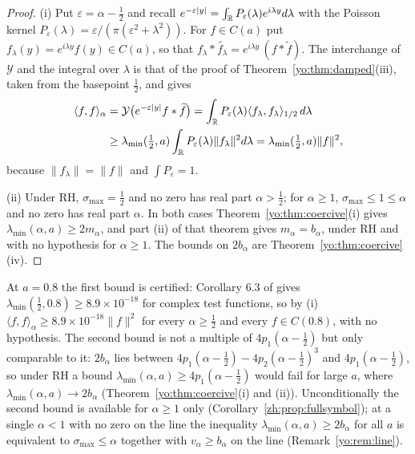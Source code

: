 \begin{proof}
(i) Put $\varepsilon=\alpha-\frac12$ and recall $e^{-\varepsilon|y|}=\int_{\mathbb{R}}P_\varepsilon(\lambda)e^{i\lambda y}d\lambda$ with the Poisson kernel $P_\varepsilon(\lambda)=\varepsilon/(\pi(\varepsilon^2+\lambda^2))$. For $f\in C(a)$ put $f_\lambda(y)=e^{i\lambda y}f(y)\in C(a)$, so that $f_\lambda*\widetilde{f_\lambda}=e^{i\lambda y}\,(f*\widetilde f)$. The interchange of $\mathcal Y$ and the integral over $\lambda$ is that of the proof of Theorem~\ref{yo:thm:damped}(iii), taken from the basepoint $\frac12$, and gives
\[
\begin{aligned}
\langle f,f\rangle_\alpha&=\mathcal Y\bigl(e^{-\varepsilon|y|}f*\widetilde f\bigr)=\int_{\mathbb{R}}P_\varepsilon(\lambda)\langle f_\lambda,f_\lambda\rangle_{1/2}\,d\lambda\\
&\ge\lambda_{\min}(\tfrac12,a)\int_{\mathbb{R}}P_\varepsilon(\lambda)\|f_\lambda\|^2d\lambda=\lambda_{\min}(\tfrac12,a)\|f\|^2,
\end{aligned}
\]
because $\|f_\lambda\|=\|f\|$ and $\int P_\varepsilon=1$.

(ii) Under RH, $\sigma_{\max}=\frac12$ and no zero has real part $\alpha>\frac12$; for $\alpha\ge1$, $\sigma_{\max}\le1\le\alpha$ and no zero has real part $\alpha$. In both cases Theorem~\ref{yo:thm:coercive}(i) gives $\lambda_{\min}(\alpha,a)\ge2m_\alpha$, and part (ii) of that theorem gives $m_\alpha=b_\alpha$, under RH and with no hypothesis for $\alpha\ge1$. The bounds on $2b_\alpha$ are Theorem~\ref{yo:thm:coercive}(iv).
\end{proof}

At $a=0.8$ the first bound is certified: Corollary 6.3 of \cite{Zhu26} gives $\lambda_{\min}(\frac12,0.8)\ge8.9\times10^{-18}$ for complex test functions, so by (i) $\langle f,f\rangle_\alpha\ge8.9\times10^{-18}\|f\|^2$ for every $\alpha\ge\frac12$ and every $f\in C(0.8)$, with no hypothesis. The second bound is not a multiple of $4p_1(\alpha-\frac12)$ but only comparable to it: $2b_\alpha$ lies between $4p_1(\alpha-\frac12)-4p_2(\alpha-\frac12)^3$ and $4p_1(\alpha-\frac12)$, so under RH a bound $\lambda_{\min}(\alpha,a)\ge4p_1(\alpha-\frac12)$ would fail for large $a$, where $\lambda_{\min}(\alpha,a)\to2b_\alpha$ (Theorem~\ref{yo:thm:coercive}(i) and (ii)). Unconditionally the second bound is available for $\alpha\ge1$ only (Corollary~\ref{zh:prop:fullsymbol}); at a single $\alpha<1$ with no zero on the line the inequality $\lambda_{\min}(\alpha,a)\ge2b_\alpha$ for all $a$ is equivalent to $\sigma_{\max}\le\alpha$ together with $v_\alpha\ge b_\alpha$ on the line (Remark~\ref{yo:rem:line}).

